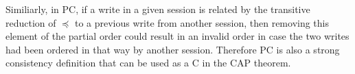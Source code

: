 \documentclass[journal,compsoc]{IEEEtran}
\begin{document}
Similiarly, in PC, if a write in a given session is related by the transitive reduction of $\preccurlyeq$  to a previous write from another session, then removing this element of the partial order could result in an invalid order in case the two writes had been ordered in that way by another session. Therefore PC is also a strong consistency definition that can be used as a C in the CAP theorem.


 
 
\end{document}
